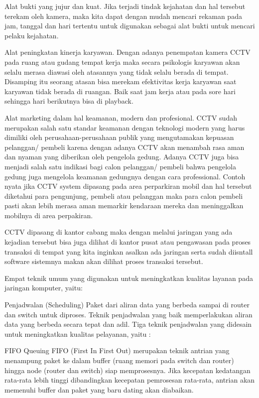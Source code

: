 \documentclass{jtetiproposalskripsi}
\begin{document}
Alat bukti yang jujur dan kuat. Jika terjadi tindak kejahatan dan hal tersebut terekam oleh kamera, maka kita dapat dengan mudah mencari rekaman pada jam, tanggal dan hari tertentu untuk digunakan sebagai alat bukti untuk mencari pelaku kejahatan.

Alat peningkatan kinerja karyawan. Dengan adanya penempatan kamera CCTV pada ruang atau gudang tempat kerja maka secara psikologis karyawan akan selalu merasa diawasi oleh atasannya yang tidak selalu berada di tempat. Disamping itu seorang atasan bisa merekam efektivitas kerja karyawan saat karyawan tidak berada di ruangan. Baik saat jam kerja atau pada sore hari sehingga hari berikutnya bisa di playback.

Alat marketing dalam hal keamanan, modern dan profesional. CCTV sudah merupakan salah satu standar keamanan dengan teknologi modern yang harus dimiliki oleh perusahaan-perusahaan publik yang mengutamakan kepuasan pelanggan/ pembeli karena dengan adanya CCTV akan menambah rasa aman dan nyaman yang diberikan oleh pengelola gedung. Adanya CCTV juga bisa menjadi salah satu indikasi bagi calon pelanggan/ pembeli bahwa pengelola gedung juga mengelola keamanan gedungnya dengan cara professional. Contoh nyata jika CCTV system dipasang pada area perparkiran mobil dan hal tersebut diketahui para pengunjung, pembeli atau pelanggan maka para calon pembeli pasti akan lebih merasa aman memarkir kendaraan mereka dan meninggalkan mobilnya di area perpakiran.

CCTV dipasang di kantor cabang maka dengan melalui jaringan yang ada kejadian tersebut bisa juga dilihat di kantor pusat atau pengawasan pada proses transaksi di tempat yang kita inginkan asalkan ada jaringan serta sudah diisntall software sistemnya makan akan dilihat proses transaksi tersebut.

Empat teknik umum yang digunakan untuk meningkatkan kualitas layanan pada jaringan komputer, yaitu:

Penjadwalan (Scheduling)
Paket dari aliran data yang berbeda sampai di router dan switch untuk diproses. Teknik penjadwalan yang baik memperlakukan aliran data yang berbeda secara tepat dan adil. Tiga teknik penjadwalan yang didesain untuk meningkatkan kualitas pelayanan, yaitu :

FIFO Queuing
FIFO (First In First Out) merupakan teknik antrian yang menampung paket ke dalam buffer (ruang memori pada switch dan router) hingga node (router dan switch) siap memprosesnya. Jika kecepatan kedatangan rata-rata lebih tinggi dibandingkan kecepatan pemrosesan rata-rata, antrian akan memenuhi buffer dan paket yang baru dating akan diabaikan.
\end{document}
